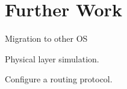 \chapter{Further Work}
\label{chapter:further}

Migration to other OS

Physical layer simulation.

Configure a routing protocol. 
